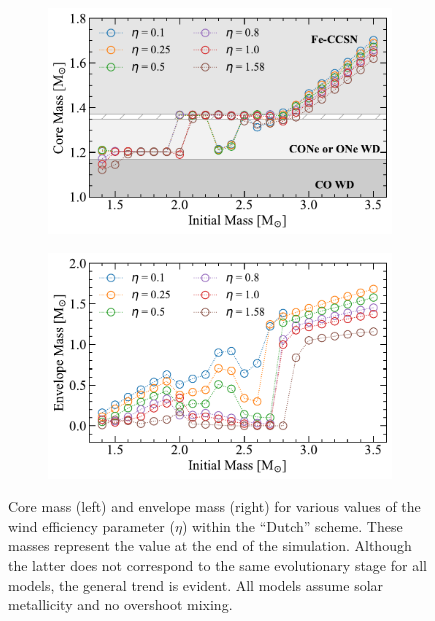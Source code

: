 \documentclass[main.tex]{subfiles}
\begin{document}
\begin{figure}[h!]
    \centering
    \begin{subfigure}{0.5\textwidth}
      \centering
      \includegraphics[width=0.95\columnwidth]{figures/chapter2/core_growth/series2_coreGrowth.pdf}
    \end{subfigure}%
    \begin{subfigure}{0.5\textwidth}
      \centering
      \includegraphics[width=0.95\columnwidth]{figures/chapter2/core_growth/series2_envelopeMass.pdf}
    \end{subfigure}
    \caption{Core mass (left) and envelope mass (right) for various values of the wind efficiency parameter ($\eta$) within the ``Dutch'' scheme. These masses represent the value at the end of the simulation. Although the latter does not correspond to the same evolutionary stage for all models, the general trend is evident.
    All models assume solar metallicity and no overshoot mixing.}
    \label{fig:etas}
\end{figure}
\end{document}
